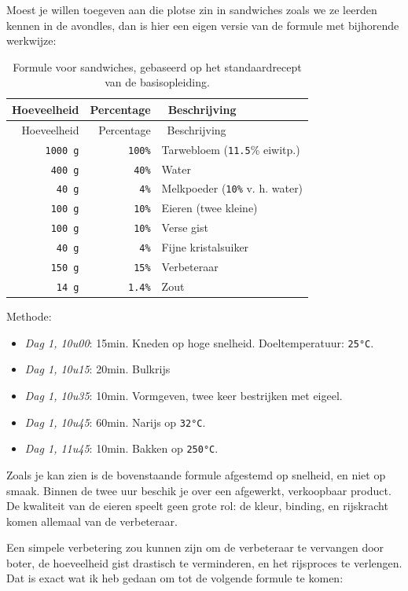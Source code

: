 \documentclass[
  11pt,
  dutch,
]{memoir}
\providecommand{\tightlist}{%
  \setlength{\itemsep}{0pt}\setlength{\parskip}{0pt}}
\begin{document}
Moest je willen toegeven aan die plotse zin in sandwiches zoals we ze
leerden kennen in de avondles, dan is hier een eigen versie van de
formule met bijhorende werkwijze:

\begin{longtable}[]{@{}rrl@{}}
\caption{Formule voor sandwiches, gebaseerd op het standaardrecept van
de basisopleiding.}\tabularnewline
\toprule
Hoeveelheid & Percentage & ~Beschrijving\tabularnewline
\midrule
\endfirsthead
\toprule
Hoeveelheid & Percentage & ~Beschrijving\tabularnewline
\midrule
\endhead
\texttt{1000\ g} & \texttt{100\%} & Tarwebloem (\texttt{11.5}\%
eiwitp.)\tabularnewline
\texttt{400\ g} & \texttt{40\%} & Water\tabularnewline
\texttt{40\ g} & \texttt{4\%} & Melkpoeder (\texttt{10\%} v. h.
water)\tabularnewline
\texttt{100\ g} & \texttt{10\%} & Eieren (twee kleine)\tabularnewline
\texttt{100\ g} & \texttt{10\%} & Verse gist\tabularnewline
\texttt{40\ g} & \texttt{4\%} & Fijne kristalsuiker\tabularnewline
~\texttt{150\ g} & \texttt{15\%} & Verbeteraar\tabularnewline
\texttt{14\ g} & \texttt{1.4\%} & Zout\tabularnewline
\bottomrule
\end{longtable}

Methode:

\begin{itemize}
\tightlist
\item
  \emph{Dag 1, 10u00}: 15min. Kneden op hoge snelheid. Doeltemperatuur:
  \texttt{25°C}.
\item
  \emph{Dag 1, 10u15}: 20min. Bulkrijs
\item
  \emph{Dag 1, 10u35}: 10min. Vormgeven, twee keer bestrijken met
  eigeel.
\item
  \emph{Dag 1, 10u45}: 60min. Narijs op \texttt{32°C}.
\item
  \emph{Dag 1, 11u45}: 10min. Bakken op \texttt{250°C}.
\end{itemize}

Zoals je kan zien is de bovenstaande formule afgestemd op snelheid, en
niet op smaak. Binnen de twee uur beschik je over een afgewerkt,
verkoopbaar product. De kwaliteit van de eieren speelt geen grote rol:
de kleur, binding, en rijskracht komen allemaal van de verbeteraar.

Een simpele verbetering zou kunnen zijn om de verbeteraar te vervangen
door boter, de hoeveelheid gist drastisch te verminderen, en het
rijsproces te verlengen. Dat is exact wat ik heb gedaan om tot de
volgende formule te komen:
\end{document}
